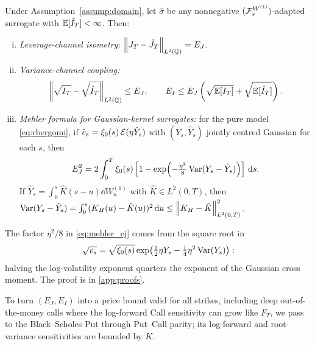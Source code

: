 \begin{theorem}
\label{thm:ledger}
Under Assumption~\ref{assump:domain}, let $\hat{\sigma}$ be any nonnegative $(\mathcal{F}_s^{W^{(1)}})$-adapted surrogate with $\mathbb{E}[\hat{I}_T]<\infty$. Then:
\begin{enumerate}[(i)]
  \item \emph{Leverage-channel isometry:} $\left\lVert J_T-\hat{J}_T\right\rVert_{L^2(\mathbb{Q})} = E_J$.
  \item \emph{Variance-channel coupling:}
  \begin{equation}
    \begin{gathered}
    \left\lVert \sqrt{I_T}-\sqrt{\hat{I}_T}\right\rVert_{L^2(\mathbb{Q})} \le E_J,
    \qquad
    E_I \le E_J\left(\sqrt{\mathbb{E}[I_T]} + \sqrt{\mathbb{E}[\hat{I}_T]}\right).
    \end{gathered}
    \label{eq:minkowski_coupling}
  \end{equation}
  \item \emph{Mehler formula for Gaussian-kernel surrogates:} for the pure model \eqref{eq:rbergomi}, if $\hat{v}_s=\xi_0(s)\,\mathcal{E}(\eta\hat{Y}_s)$ with $(Y_s,\hat{Y}_s)$ jointly centred Gaussian for each $s$, then
  \begin{equation}
    E_J^2 = 2\int_0^T \xi_0(s)\left[1 - \exp\!\left(-\tfrac{\eta^2}{8}\operatorname{Var}(Y_s-\hat{Y}_s)\right)\right]\,\mathrm{d} s.
    \label{eq:mehler_ej}
  \end{equation}
  If $\hat{Y}_s=\int_0^s \hat{K}(s-u)\dd W_u^{(1)}$ with $\hat{K}\in L^2(0,T)$, then $\operatorname{Var}(Y_s-\hat{Y}_s)=\int_0^s (K_H(u)-\hat{K}(u))^2\,\mathrm{d} u\le\left\lVert K_H-\hat{K}\right\rVert_{L^2(0,T)}^2$.
\end{enumerate}
\end{theorem}

The factor $\eta^2/8$ in \eqref{eq:mehler_ej} comes from the square root in
\[
  \sqrt{v_s}=\sqrt{\xi_0(s)}\exp\!\left(\tfrac12\eta Y_s-\tfrac14\eta^2\operatorname{Var}(Y_s)\right):
\]
halving the log-volatility exponent quarters the exponent of the Gaussian cross moment. The proof is in \ref{app:proofs}.

To turn $(E_J,E_I)$ into a price bound valid for all strikes, including deep out-of-the-money calls where the log-forward Call sensitivity can grow like $F_T$, we pass to the Black--Scholes Put through Put--Call parity; its log-forward and root-variance sensitivities are bounded by $K$.

